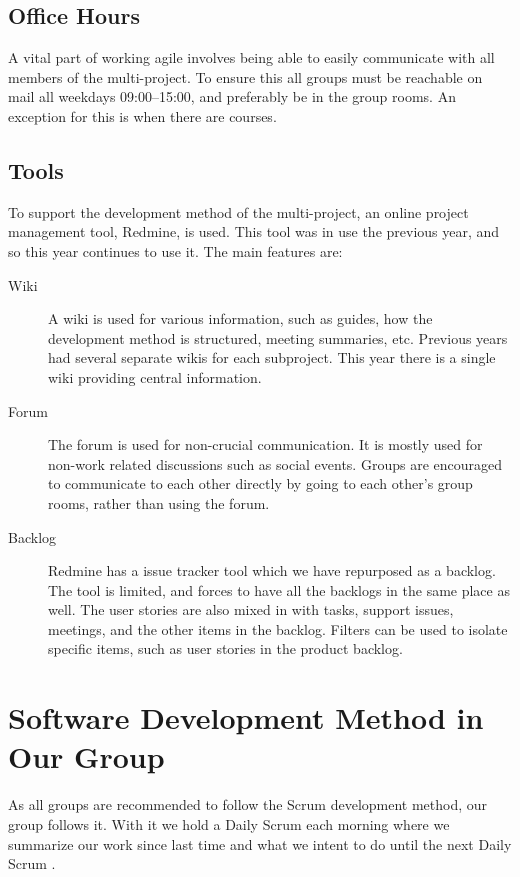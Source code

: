 \subsection{Office Hours}
A vital part of working agile involves being able to easily communicate with all members of the multi-project. To ensure this all groups must be reachable on mail all weekdays 09:00--15:00, and preferably be in the group rooms. An exception for this is when there are courses.

\subsection{Tools}\label{sec:tools}
To support the development method of the multi-project, an online project management tool, Redmine\parencite{redmine-website}, is used. This tool was in use the previous year, and so this year continues to use it. The main features are:

\begin{description}
  \item[Wiki] A wiki is used for various information, such as guides, how the development method is structured, meeting summaries, etc. Previous years had several separate wikis for each subproject. This year there is a single wiki providing central information.
  \item[Forum] The forum is used for non-crucial communication. It is mostly used for non-work related discussions such as social events. Groups are encouraged to communicate to each other directly by going to each other's group rooms, rather than using the forum.
  \item[Backlog] Redmine has a issue tracker tool which we have repurposed as a backlog. The tool is limited, and forces to have all the backlogs in the same place as well. The user stories are also mixed in with tasks, support issues, meetings, and the other items in the backlog. Filters can be used to isolate specific items, such as user stories in the product backlog.
\end{description}

\section{Software Development Method in Our Group}\label{sec:swmethod_ourgroup}
As all groups are recommended to follow the Scrum development method, our group follows it. With it we hold a Daily Scrum each morning where we summarize our work since last time and what we intent to do until the next Daily Scrum .


